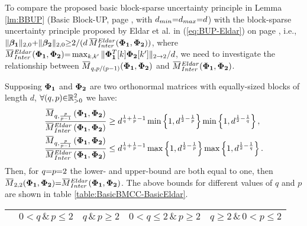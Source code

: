 To compare the proposed basic block-sparse uncertainty principle in Lemma \ref{lm:BBUP} (Basic Block-UP, page \pageref{lm:BBUP}, with $d_{min} {=} d_{max} {=} d$) with the block-sparse uncertainty principle proposed by Eldar et al. in (\ref{eq:BUP-Eldar}) on page \pageref{eq:BUP-Eldar}, i.e., $\Vert \mybetao \Vert_{2,0} \spl \Vert\mybetaTwo \Vert_{2,0} 
\sgeq 2/(d \, \overbar{M}^{Eldar}_{Inter} (\myPhi_{\boldsymbol{1}},\myPhi_{\boldsymbol{2}}))$, where $\overbar{M}^{Eldar}_{Inter}(\myPhi_{\boldsymbol{1}},\myPhi_{\boldsymbol{2}}) \seq \max_{k,k'} \Vert \myPhi_{\boldsymbol{1}}^T [k] \myPhi_{\boldsymbol{2}} [k'] \Vert_{2 \to 2} / d$, we need to investigate the relationship between $\overbar{M}_{q,p/(p \sm 1)} (\myPhiOne , \myPhiTwo)$ and $\overbar{M}^{Eldar}_{Inter}(\myPhiOne,\myPhiTwo)$.
\begin{property}
\label{prp:DontKnow3}
Supposing $\boldsymbol{\Phi}_{\boldsymbol{1}}$ and $\boldsymbol{\Phi}_{\boldsymbol{2}}$ are two orthonormal matrices with equally-sized blocks of length $d$, $\forall (q , p) {\in} \mathbb{R}^2_{{>} 0}$ we have:
\begin{gather*}
\begin{aligned}
&\frac{\overbar{M}_{q,\frac{p}{p-1}}\myparanthese{\myPhiOne , \myPhiTwo}}{\overbar{M}^{Eldar}_{Inter}\myparanthese{\myPhiOne , \myPhiTwo}} \geq 
d^{\frac1q + \frac1p - 1} \min \mybrace{1 , d^{\frac{1}{2} -\frac1p}} \min \mybrace{1 , d^{\frac{1}{2} - \frac1q}}, \\
&\frac{\overbar{M}_{q,\frac{p}{p-1}}\myparanthese{\myPhiOne , \myPhiTwo}}{\overbar{M}^{Eldar}_{Inter}\myparanthese{\myPhiOne , \myPhiTwo}} \leq 
d^{\frac1q + \frac1p - 1} \max \mybrace{1 , d^{\frac{1}{2} -\frac1p}} \max \mybrace{1 , d^{\frac{1}{2} - \frac1q}}.
\end{aligned}
\end{gather*}
Then, for $q {=} p {=} 2$ the lower- and upper-bound are both equal to one, then $\overbar{M}_{2,2}(\myPhiOne,\myPhiTwo) \seq \overbar{M}^{Eldar}_{Inter}(\myPhiOne,\myPhiTwo)$.
The above bounds for different values of $q$ and $p$ are shown in table \ref{table:BasicBMCC-BasicEldar}.
\begin{table}[bp]
\centering
\begin{tabular}{ccccc}
\toprule
\multicolumn{1}{c}{} &\multicolumn{1}{c}{${0 < q\, \& \, p \leq 2}$} & \multicolumn{1}{c}{${q\, \& \, p \geq 2}$}  & \multicolumn{1}{c}{${0 < q \leq 2\, \& \, p \geq 2}$} & \multicolumn{1}{c}{${q \geq 2\, \& \, 0 < p \leq 2}$} \\ \midrule %

\end{tabular}
\end{table}
\end{property}
